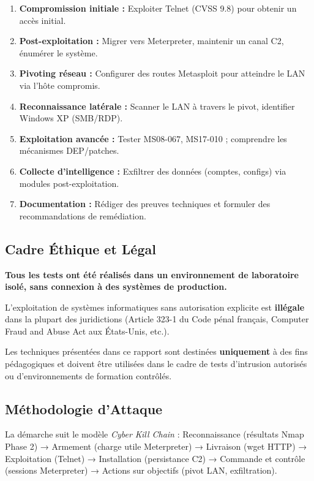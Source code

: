 \documentclass[12pt,a4paper,openany]{report}
\begin{document}
	\begin{enumerate}[leftmargin=*]
		\item \textbf{Compromission initiale :} Exploiter Telnet (CVSS 9.8) pour obtenir un accès initial.
		\item \textbf{Post-exploitation :} Migrer vers Meterpreter, maintenir un canal C2, énumérer le système.
		\item \textbf{Pivoting réseau :} Configurer des routes Metasploit pour atteindre le LAN via l'hôte compromis.
		\item \textbf{Reconnaissance latérale :} Scanner le LAN à travers le pivot, identifier Windows XP (SMB/RDP).
		\item \textbf{Exploitation avancée :} Tester MS08-067, MS17-010 ; comprendre les mécanismes DEP/patches.
		\item \textbf{Collecte d'intelligence :} Exfiltrer des données (comptes, configs) via modules post-exploitation.
		\item \textbf{Documentation :} Rédiger des preuves techniques et formuler des recommandations de remédiation.
	\end{enumerate}
	
	\subsection{Cadre Éthique et Légal}
	
	\begin{tcolorbox}[colback=accent!5!white, colframe=accent, title=\textbf{AVERTISSEMENT LÉGAL}]
		\textbf{Tous les tests ont été réalisés dans un environnement de laboratoire isolé, sans connexion à des systèmes de production.}
		
		L'exploitation de systèmes informatiques sans autorisation explicite est \textbf{illégale} dans la plupart des juridictions (Article 323-1 du Code pénal français, Computer Fraud and Abuse Act aux États-Unis, etc.).
		
		Les techniques présentées dans ce rapport sont destinées \textbf{uniquement} à des fins pédagogiques et doivent être utilisées dans le cadre de tests d'intrusion autorisés ou d'environnements de formation contrôlés.
	\end{tcolorbox}
	
	\subsection{Méthodologie d'Attaque}
	
	La démarche suit le modèle \textit{Cyber Kill Chain} : Reconnaissance (résultats Nmap Phase 2) → Armement (charge utile Meterpreter) → Livraison (wget HTTP) → Exploitation (Telnet) → Installation (persistance C2) → Commande et contrôle (sessions Meterpreter) → Actions sur objectifs (pivot LAN, exfiltration).
	
\end{document}
